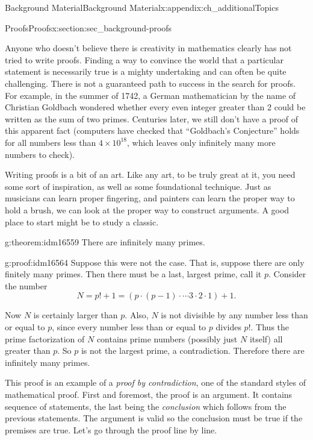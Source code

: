 \documentclass[oneside,10pt,]{book}
\numberwithin{equation}{chapter}
\begin{document}
\begin{appendixptx}{Background Material}{}{Background Material}{}{}{x:appendix:ch_additionalTopics}
\begin{sectionptx}{Proofs}{}{Proofs}{}{}{x:section:sec_background-proofs}
\begin{introduction}{}
Anyone who doesn't believe there is creativity in mathematics clearly has not tried to write proofs. Finding a way to convince the world that a particular statement is necessarily true is a mighty undertaking and can often be quite challenging. There is not a guaranteed path to success in the search for proofs. For example, in the summer of 1742, a German mathematician by the name of Christian Goldbach wondered whether every even integer greater than 2 could be written as the sum of two primes. Centuries later, we still don't have a proof of this apparent fact (computers have checked that ``Goldbach's Conjecture'' holds for all numbers less than \(4\times 10^{18}\), which leaves only infinitely many more numbers to check).%
\par
Writing proofs is a bit of an art. Like any art, to be truly great at it, you need some sort of inspiration, as well as some foundational technique. Just as musicians can learn proper fingering, and painters can learn the proper way to hold a brush, we can look at the proper way to construct arguments. A good place to start might be to study a classic.%
\begin{theorem}{}{}{g:theorem:idm16559}%
There are infinitely many primes.%
\end{theorem}
\begin{proofptx}{}{g:proof:idm16564}
Suppose this were not the case. That is, suppose there are only finitely many primes. Then there must be a last, largest prime, call it \(p\). Consider the number%
\begin{equation*}
N = p! + 1 = (p \cdot (p-1) \cdot \cdots 3\cdot 2 \cdot 1) + 1.
\end{equation*}
%
\par
Now \(N\) is certainly larger than \(p\). Also, \(N\) is not divisible by any number less than or equal to \(p\), since every number less than or equal to \(p\) divides \(p!\). Thus the prime factorization of \(N\) contains prime numbers (possibly just \(N\) itself) all greater than \(p\). So \(p\) is not the largest prime, a contradiction. Therefore there are infinitely many primes.%
\end{proofptx}
This proof is an example of a \emph{proof by contradiction}, one of the standard styles of mathematical proof. First and foremost, the proof is an argument. It contains sequence of statements, the last being the \emph{conclusion} which follows from the previous statements. The argument is valid so the conclusion must be true if the premises are true. Let's go through the proof line by line.%

\end{introduction}
\end{sectionptx}
\end{appendixptx}
\end{document}
